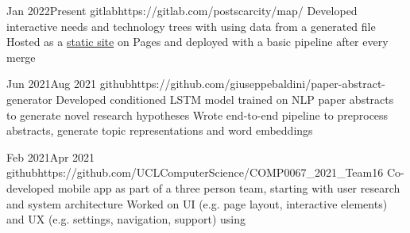 

       {Jan 2022}{Present}
{gitlab}{https://gitlab.com/postscarcity/map/}
{Developed interactive needs and technology trees with  using data from a generated  file}
{Hosted as a \href{https://postscarcitymap.org/}{static site} on  Pages and deployed with a basic  pipeline after every  merge}


      {Jun 2021}{Aug 2021}
{github}{https://github.com/giuseppebaldini/paper-abstract-generator}
{Developed conditioned LSTM model trained on NLP paper abstracts to generate novel research hypotheses}
{Wrote end-to-end pipeline to preprocess abstracts, generate topic representations and word embeddings}


              {Feb 2021}{Apr 2021}
{github}{https://github.com/UCLComputerScience/COMP0067_2021_Team16}
{Co-developed mobile app as part of a three person team, starting with user research and system architecture}
{Worked on UI (e.g. page layout, interactive elements) and UX (e.g. settings, navigation, support) using }

